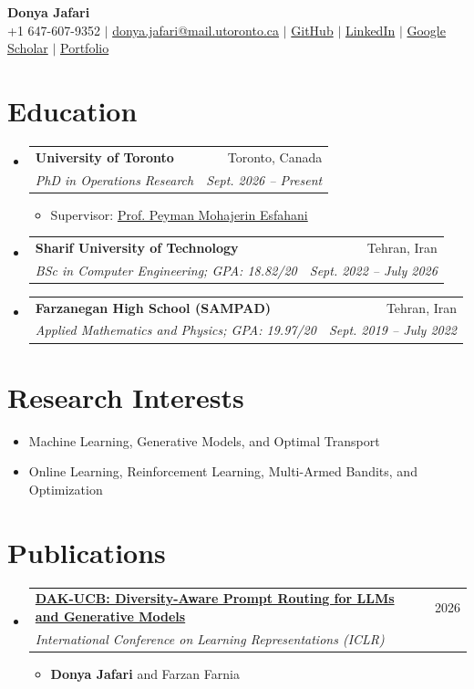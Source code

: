 \documentclass[letterpaper,11pt]{article}
\makeatletter
\newcommand{\resumeItem}[1]{
  \item\small{#1}
}
\newcommand{\resumeSubheading}[4]{
  \item
  \begin{tabular*}{\linewidth}[t]{l@{\extracolsep{\fill}}r}
    \textbf{#1} & #2 \\
    \textit{\small #3} & \textit{\small #4} \\
  \end{tabular*}\vspace{-4pt}
}
\newcommand{\resumeSubHeadingListStart}{\begin{itemize}[leftmargin=0.15in,label={},itemsep=6pt,parsep=0pt,topsep=4pt]}
\newcommand{\resumeSubHeadingListEnd}{\end{itemize}}
\newcommand{\resumeItemListStart}{\begin{itemize}[leftmargin=0.22in,itemsep=2pt,parsep=0pt,topsep=4pt]}
\newcommand{\resumeItemListEnd}{\end{itemize}\vspace{-2pt}}
\makeatother
\begin{document}
\begin{center}
  \textbf{\Huge Donya Jafari} \\[4pt]
  \small
  +1 647-607-9352 $|$
  \href{mailto:donya.jafari@mail.utoronto.ca}{donya.jafari@mail.utoronto.ca} $|$
  \href{https://github.com/Donya-Jafari}{GitHub} $|$
  \href{https://linkedin.com/in/donyajafari}{LinkedIn} $|$
  \href{https://scholar.google.com/citations?user=WCK7U_UAAAAJ\&hl=en}{Google Scholar} $|$
  \href{https://donya-jafari.github.io/about.html?theme=dark}{Portfolio}
\end{center}

\section{Education}
\resumeSubHeadingListStart
  \resumeSubheading
    {University of Toronto}{Toronto, Canada}
    {PhD in Operations Research}{Sept. 2026 -- Present}
    \resumeItemListStart
      \resumeItem{Supervisor: \href{https://scholar.google.com/citations?hl=en\&user=ZTan-7YAAAAJ\&view_op=list_works\&sortby=pubdate}{Prof. Peyman Mohajerin Esfahani}}
    \resumeItemListEnd

  \resumeSubheading
    {Sharif University of Technology}{Tehran, Iran}
    {BSc in Computer Engineering; GPA: 18.82/20}{Sept. 2022 -- July 2026}

  \resumeSubheading
    {Farzanegan High School (SAMPAD)}{Tehran, Iran}
    {Applied Mathematics and Physics; GPA: 19.97/20}{Sept. 2019 -- July 2022}
\resumeSubHeadingListEnd

\section{Research Interests}
\begin{itemize}[leftmargin=0.18in,itemsep=0pt,parsep=0pt,topsep=4pt]
  \small
  \item Machine Learning, Generative Models, and Optimal Transport
  \item Online Learning, Reinforcement Learning, Multi-Armed Bandits, and Optimization
\end{itemize}

\section{Publications}
\resumeSubHeadingListStart
  \resumeSubheading
    {\href{https://arxiv.org/abs/2603.23140}{DAK-UCB: Diversity-Aware Prompt Routing for LLMs and Generative Models}}{2026}
    {International Conference on Learning Representations (ICLR)}{}
    \resumeItemListStart
      \resumeItem{\textbf{Donya Jafari} and Farzan Farnia}
    \resumeItemListEnd
\resumeSubHeadingListEnd
\end{document}
